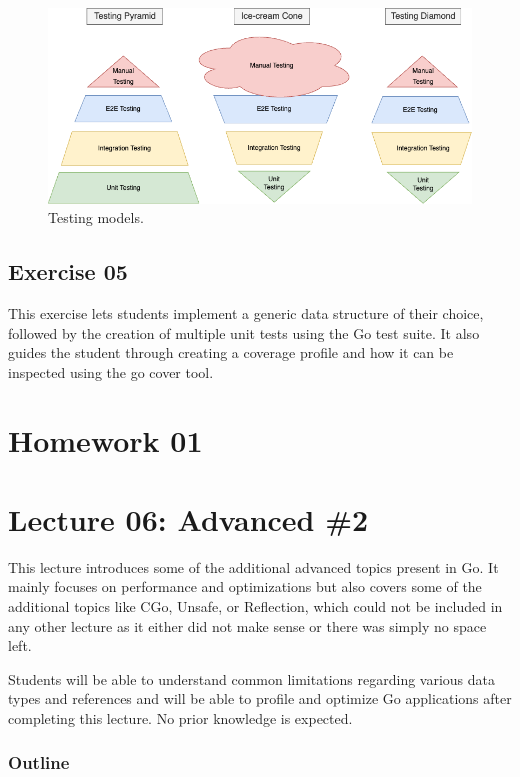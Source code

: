 \documentclass[
  digital,
  color,
  oneside,
  nosansbold,
  nocolorbold,
  nolof,
  nolot,
]{fithesis4}
\begin{document}
\begin{figure}[H]
    \centering
    \includegraphics[width=12cm]{figures/pyramids.png}
    \caption{Testing models.}
    \label{fig:testing-models}
\end{figure}

\subsection{Exercise 05}

This exercise lets students implement a generic data structure of their choice, followed by the creation of multiple unit tests using the Go test suite. It also guides the student through creating a coverage profile and how it can be inspected using the go cover tool.

\section{Homework 01}

\section{Lecture 06: Advanced \#2}

This lecture introduces some of the additional advanced topics present in Go. It mainly focuses on performance and optimizations but also covers some of the additional topics like CGo, Unsafe, or Reflection, which could not be included in any other lecture as it either did not make sense or there was simply no space left.

Students will be able to understand common limitations regarding various data types and references and will be able to profile and optimize Go applications after completing this lecture. No prior knowledge is expected.

\subsubsection{Outline}
\end{document}

